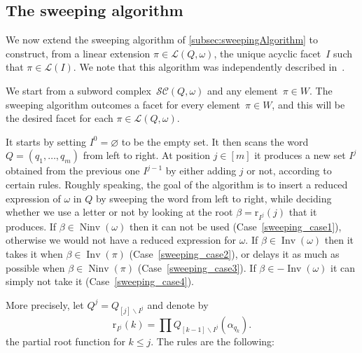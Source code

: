 \documentclass[reqno]{amsart}
\theoremstyle{definition}
\newcommand{\ssm}{\smallsetminus} %
\DeclareMathOperator{\Inv}{Inv} %
\DeclareMathOperator{\Ninv}{Ninv} %
\newcommand{\linearExtensions}{\mathcal{L}} %
\newcommand{\subwordComplex}{\mathcal{SC}} %
\newcommand{\rootFunction}[2]{\mathrm{r}_{#1}(#2)} %
\newcommand{\subwordFacets}{\mathcal{F}} %
\newcommand{\sweepingAlgorithm}{\mathsf{sweep}} %
\begin{document}

\subsection{The sweeping algorithm}
\label{subsec:sweepingAlgorithmSubwordComplexes}

We now extend the sweeping algorithm of \cref{subsec:sweepingAlgorithm} to construct, from a linear extension $\pi \in \linearExtensions(Q,\omega)$, the unique acyclic facet~$I$ such that $\pi \in \linearExtensions(I)$.
We note that this algorithm was independently described in~\cite{JahnStump}.

We start from a subword complex~$\subwordComplex(Q, \omega)$ and any element~$\pi \in W$.
The sweeping algorithm outcomes a facet for every element~$\pi \in W$, and this will be the desired facet for each $\pi \in \linearExtensions(Q,\omega)$.

It starts by setting $I^0=\varnothing$ to be the empty set.
It then scans the word $Q=(q_1,\dots ,q_m)$ from left to right.
At position $j\in [m]$ it produces a new set $I^j$ obtained from the previous one $I^{j-1}$ by either adding $j$ or not, according to certain rules.
Roughly speaking, the goal of the algorithm is to insert a reduced expression of $\omega$ in $Q$ by sweeping the word from left to right, while deciding whether we use a letter or not by looking at the root $\beta=\rootFunction{I^j}{j}$ that it produces.
If $\beta \in \Ninv(\omega)$ then it can not be used (Case~\ref{sweeping_case1}), otherwise we would not have a reduced expression for $\omega$.
If $\beta \in \Inv(\omega)$ then it takes it when $\beta \in \Inv(\pi)$ (Case~\ref{sweeping_case2}), or delays it as much as possible when $\beta \in \Ninv(\pi)$ (Case~\ref{sweeping_case3}).
If $\beta \in -\Inv(\omega)$ it can simply not take it (Case~\ref{sweeping_case4}).

More precisely, let $Q^j=Q_{[j]\ssm I^j}$ and denote by
\[
\rootFunction{I^j}{k} = \prod Q_{[k-1]\ssm I^j}(\alpha_{q_k}).
\]
the partial root function for $k\leq j$.  
The rules are the following:
\end{document}
